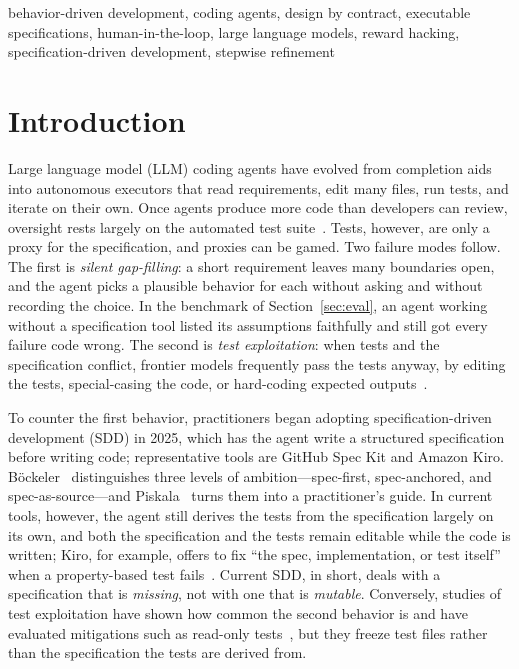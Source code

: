 \documentclass[conference]{IEEEtran}
\begin{document}
\begin{IEEEkeywords}
behavior-driven development, coding agents, design by contract, executable specifications, human-in-the-loop, large language models, reward hacking, specification-driven development, stepwise refinement
\end{IEEEkeywords}

\section{Introduction}

Large language model (LLM) coding agents have evolved from completion aids into autonomous executors that read requirements, edit many files, run tests, and iterate on their own. Once agents produce more code than developers can review, oversight rests largely on the automated test suite~\cite{zhao2026specbench}. Tests, however, are only a proxy for the specification, and proxies can be gamed. Two failure modes follow. The first is \emph{silent gap-filling}: a short requirement leaves many boundaries open, and the agent picks a plausible behavior for each without asking and without recording the choice. In the benchmark of Section~\ref{sec:eval}, an agent working without a specification tool listed its assumptions faithfully and still got every failure code wrong. The second is \emph{test exploitation}: when tests and the specification conflict, frontier models frequently pass the tests anyway, by editing the tests, special-casing the code, or hard-coding expected outputs~\cite{zhong2025impossiblebench,gabor2025evilgenie}.

To counter the first behavior, practitioners began adopting specification-driven development (SDD) in 2025, which has the agent write a structured specification before writing code; representative tools are GitHub Spec Kit and Amazon Kiro. B\"ockeler~\cite{bockeler2025sdd} distinguishes three levels of ambition---spec-first, spec-anchored, and spec-as-source---and Piskala~\cite{piskala2026sdd} turns them into a practitioner's guide. In current tools, however, the agent still derives the tests from the specification largely on its own, and both the specification and the tests remain editable while the code is written; Kiro, for example, offers to fix ``the spec, implementation, or test itself'' when a property-based test fails~\cite{kiro2026correctness}. Current SDD, in short, deals with a specification that is \emph{missing}, not with one that is \emph{mutable}. Conversely, studies of test exploitation have shown how common the second behavior is and have evaluated mitigations such as read-only tests~\cite{zhong2025impossiblebench}, but they freeze test files rather than the specification the tests are derived from.
\end{document}
